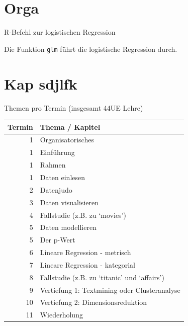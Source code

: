 \section{Orga}\label{orga}

\begin{frame}[fragile]{R-Befehl zur logistischen Regression}

Die Funktion \texttt{glm} führt die logistische Regression durch.

\begin{Shaded}
\begin{Highlighting}[]
\StringTok{ }\StringTok{ }
             \NormalTok{(}\NormalTok{),}
             
\end{Highlighting}
\end{Shaded}

\end{frame}

\section{Kap sdjlfk}\label{kap-sdjlfk}

\begin{frame}{Themen pro Termin (insgesamt 44UE Lehre)}

\begin{longtable}[]{@{}rl@{}}
\toprule
Termin & Thema / Kapitel\tabularnewline
\midrule
\endhead
1 & Organisatorisches\tabularnewline
1 & Einführung\tabularnewline
1 & Rahmen\tabularnewline
1 & Daten einlesen\tabularnewline
2 & Datenjudo\tabularnewline
3 & Daten visualisieren\tabularnewline
4 & Fallstudie (z.B. zu `movies')\tabularnewline
5 & Daten modellieren\tabularnewline
5 & Der p-Wert\tabularnewline
6 & Lineare Regression - metrisch\tabularnewline
7 & Lineare Regression - kategorial\tabularnewline
8 & Fallstudie (z.B. zu `titanic' und `affairs')\tabularnewline
9 & Vertiefung 1: Textmining oder Clusteranalyse\tabularnewline
10 & Vertiefung 2: Dimensionsreduktion\tabularnewline
11 & Wiederholung\tabularnewline
\bottomrule
\end{longtable}

\end{frame}

